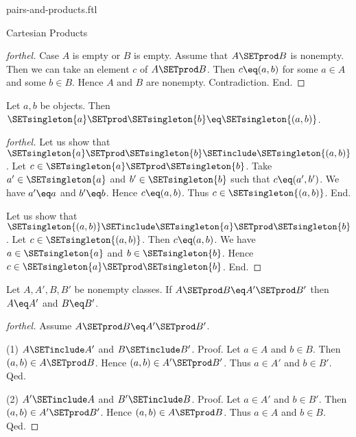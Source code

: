 \documentclass{naproche-library}
\begin{document}
\begin{smodule}[title=Ordered Pairs and Cartesian Products]{pairs-and-products.ftl}
\begin{sfragment}{Cartesian Products}
\begin{proof}[forthel]
    Case $A$ is empty or $B$ is empty.
      Assume that $A \SETprod B$ is nonempty.
      Then we can take an element $c$ of $A \SETprod B$.
      Then $c \eq (a, b)$ for some $a \in A$ and some $b \in B$.
      Hence $A$ and $B$ are nonempty.
      Contradiction.
    End.
  \end{proof}

  \begin{proposition}[forthel,id=FOUNDATIONS_04_7971087096741888]
    Let $a, b$ be objects.
    Then $\SETsingleton{a} \SETprod \SETsingleton{b} \eq \SETsingleton{(a, b)}$.
  \end{proposition}
  \begin{proof}[forthel]
    Let us show that $\SETsingleton{a} \SETprod \SETsingleton{b} \SETinclude \SETsingleton{(a, b)}$.
      Let $c \in \SETsingleton{a} \SETprod \SETsingleton{b}$.
      Take $a' \in \SETsingleton{a}$ and $b' \in \SETsingleton{b}$ such that $c \eq (a', b')$.
      We have $a' \eq a$ and $b' \eq b$.
      Hence $c \eq (a, b)$.
      Thus $c \in \SETsingleton{(a, b)}$.
    End.

    Let us show that $\SETsingleton{(a, b)} \SETinclude \SETsingleton{a} \SETprod \SETsingleton{b}$.
      Let $c \in \SETsingleton{(a, b)}$.
      Then $c \eq (a, b)$.
      We have $a \in \SETsingleton{a}$ and $b \in \SETsingleton{b}$.
      Hence $c \in \SETsingleton{a} \SETprod \SETsingleton{b}$.
    End.
  \end{proof}

  \begin{proposition}[forthel,id=FOUNDATIONS_04_7456594440749056]
    Let $A, A', B, B'$ be nonempty classes.
    If $A \SETprod B \eq A' \SETprod B'$ then $A \eq A'$ and $B \eq B'$.
  \end{proposition}
  \begin{proof}[forthel]
    Assume $A \SETprod B \eq A' \SETprod B'$.

    (1) $A \SETinclude A'$ and $B \SETinclude B'$. \newline
    Proof.
      Let $a \in A$ and $b \in B$.
      Then $(a,b) \in A \SETprod B$.
      Hence $(a,b) \in A' \SETprod B'$.
      Thus $a \in A'$ and $b \in B'$.
    Qed.

    (2) $A' \SETinclude A$ and $B' \SETinclude B$. \newline
    Proof.
      Let $a \in A'$ and $b \in B'$.
      Then $(a,b) \in A' \SETprod B'$.
      Hence $(a,b) \in A \SETprod B$.
      Thus $a \in A$ and $b \in B$.
    Qed.
  \end{proof}
\end{sfragment}
\end{smodule}
\end{document}
